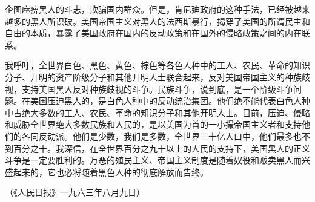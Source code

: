 企图麻痹黑人的斗志，欺骗国内群众。但是，肯尼廸政府的这种手法，已经被越来越多的黑人所识破。美国帝国主义对黑人的法西斯暴行，揭穿了美国的所谓民主和自由的本质，暴露了美国政府在国内的反动政策和在国外的侵略政策之间的内在联系。

我呼吁，全世界白色、黑色、黄色、棕色等各色人种中的工人、农民、革命的知识分子、开明的资产阶级分子和其他开明人士联合起来，反对美国帝国主义的种族歧视，支持美国黑人反对种族歧视的斗争。民族斗争，说到底，是一个阶级斗争问题。在美国压迫黑人的，是白色人种中的反动统治集团。他们绝不能代表白色人种中占绝大多数的工人、农民、革命的知识分子和其他开明人士。目前，压迫、侵略和威胁全世界绝大多数民族和人民的，是以美国为首的一小撮帝国主义者和支持他们的各同反动派。他们是少数，我们是多数，全世界三十亿人口中，他们最多也不到百分之十。我深信，在全世界百分之九十以上的人民的支持下，美国黑人的正义斗争是一定要胜利的。万恶的殖民主义、帝国主义制度是随着奴役和贩卖黑人而兴盛起来的，它也必将随着黑色人种的彻底解放而告终。

{\raggedleft （《人民日报》一九六三年八月九日）\par}


